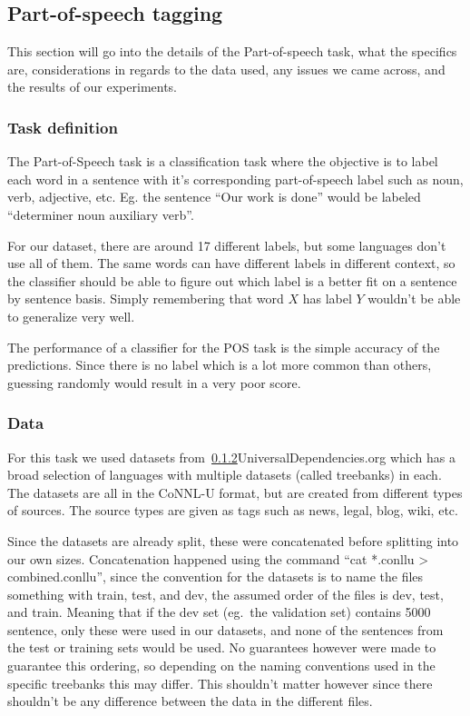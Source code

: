 
\subsection{Part-of-speech tagging}

This section will go into the details of the Part-of-speech task, what the
specifics are, considerations in regards to the data used, any issues we came
across, and the results of our experiments.

\subsubsection{Task definition}

The Part-of-Speech task is a classification task where the objective is to label
each word in a sentence with it's corresponding part-of-speech label such as
noun, verb, adjective, etc. Eg. the sentence ``Our work is done'' would be
labeled ``determiner noun auxiliary verb''.

For our dataset, there are around 17 different labels, but some languages don't
use all of them. The same words can have different labels in different context,
so the classifier should be able to figure out which label is a better fit on a
sentence by sentence basis. Simply remembering that word $X$ has label $Y$
wouldn't be able to generalize very well.

The performance of a classifier for the POS task is the simple accuracy of the
predictions. Since there is no label which is a lot more common than others,
guessing randomly would result in a very poor score. 

\subsubsection{Data}

For this task we used datasets from~\ref{}{UniversalDependencies.org} which has
a broad selection of languages with multiple datasets (called treebanks) in
each. The datasets are all in the CoNNL-U format, but are created from different
types of sources. The source types are given as tags such as news, legal, blog,
wiki, etc.

Since the datasets are already split, these were concatenated before splitting
into our own sizes. Concatenation happened using the command ``cat *.conllu >
combined.conllu'', since the convention for the datasets is to name the files
something with train, test, and dev, the assumed order of the files is dev,
test, and train. Meaning that if the dev set (eg.\ the validation set) contains
5000 sentence, only these were used in our datasets, and none of the sentences
from the test or training sets would be used. No guarantees however were made to
guarantee this ordering, so depending on the naming conventions used in the
specific treebanks this may differ. This shouldn't matter however since there
shouldn't be any difference between the data in the different files.

